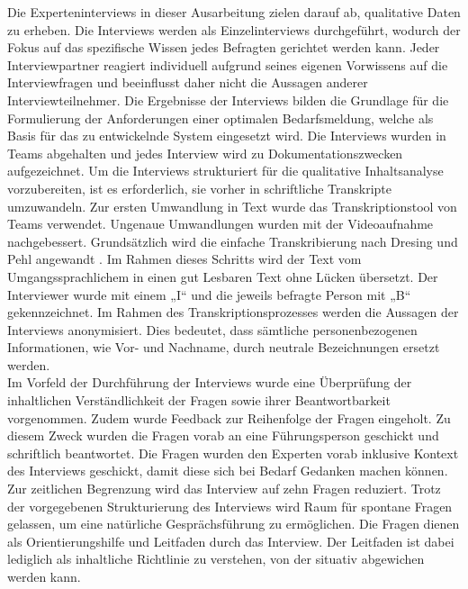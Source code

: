 Die Experteninterviews in dieser Ausarbeitung zielen darauf ab, qualitative Daten zu erheben. Die Interviews werden als Einzelinterviews durchgeführt, wodurch der Fokus auf das spezifische Wissen jedes Befragten gerichtet werden kann. Jeder Interviewpartner reagiert individuell aufgrund seines eigenen Vorwissens auf die Interviewfragen und beeinflusst daher nicht die Aussagen anderer Interviewteilnehmer. Die Ergebnisse der Interviews bilden die Grundlage für die Formulierung der Anforderungen einer optimalen Bedarfsmeldung, welche als Basis für das zu entwickelnde System eingesetzt wird. Die Interviews wurden in Teams abgehalten und jedes Interview wird zu Dokumentationszwecken aufgezeichnet. Um die Interviews strukturiert für die qualitative Inhaltsanalyse vorzubereiten, ist es erforderlich, sie vorher in schriftliche Transkripte umzuwandeln. Zur ersten Umwandlung in Text wurde das Transkriptionstool von Teams verwendet. Ungenaue Umwandlungen wurden mit der Videoaufnahme nachgebessert. Grundsätzlich wird die einfache Transkribierung nach Dresing und Pehl angewandt \cite{dresing2015praxisbuch}. Im Rahmen dieses Schritts wird der Text vom Umgangssprachlichem in einen gut Lesbaren Text ohne Lücken übersetzt. Der Interviewer wurde mit einem „I“ und die jeweils befragte Person mit „B“ gekennzeichnet. Im Rahmen des Transkriptionsprozesses werden die Aussagen der Interviews anonymisiert. Dies bedeutet, dass sämtliche personenbezogenen Informationen, wie Vor- und Nachname, durch neutrale Bezeichnungen ersetzt werden.\\

Im Vorfeld der Durchführung der Interviews wurde eine Überprüfung der inhaltlichen Verständlichkeit der Fragen sowie ihrer Beantwortbarkeit vorgenommen. Zudem wurde Feedback zur Reihenfolge der Fragen eingeholt. Zu diesem Zweck wurden die Fragen vorab an eine Führungsperson geschickt und schriftlich beantwortet. Die Fragen wurden den Experten vorab inklusive Kontext des Interviews geschickt, damit diese sich bei Bedarf Gedanken machen können. Zur zeitlichen Begrenzung wird das Interview auf zehn Fragen reduziert. Trotz der vorgegebenen Strukturierung des Interviews wird Raum für spontane Fragen gelassen, um eine natürliche Gesprächsführung zu ermöglichen. Die Fragen dienen als Orientierungshilfe und Leitfaden durch das Interview. Der Leitfaden ist dabei lediglich als inhaltliche Richtlinie zu verstehen, von der situativ abgewichen werden kann.
